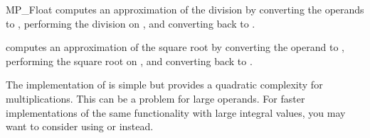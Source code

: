 \begin{ccRefClass} {MP_Float}
{computes an approximation of the division by converting the operands to
, performing the division on , and converting back to
.}

{computes an approximation of the square root by converting the operand to
, performing the square root on , and converting back
to .}


\ccImplementation 
The implementation of  is simple but provides a quadratic
complexity for multiplications.  This can be a problem for large operands.
For faster implementations of the same functionality with large integral
values, you may want to consider using  or  instead.

\end{ccRefClass} 
